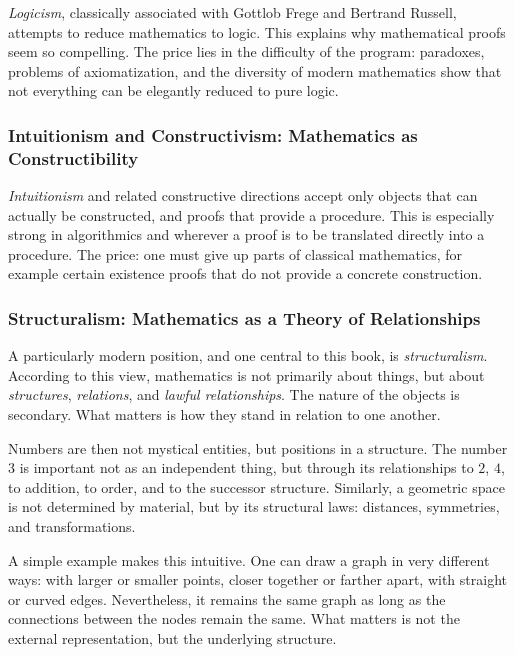 \emph{Logicism},
classically associated with Gottlob Frege
and Bertrand Russell,
attempts
to reduce mathematics to logic.
This explains
why mathematical proofs seem so compelling.
The price lies in the difficulty of the program:
paradoxes,
problems of axiomatization,
and the diversity of modern mathematics show
that not everything can be elegantly reduced to pure logic.

\subsubsection*{Intuitionism and Constructivism: Mathematics as Constructibility}

\emph{Intuitionism}
and related constructive directions accept only objects
that can actually be constructed,
and proofs
that provide a procedure.
This is especially strong in algorithmics
and wherever a proof is to be translated directly into a procedure.
The price:
one must give up parts of classical mathematics,
for example certain existence proofs
that do not provide a concrete construction.

\subsubsection*{Structuralism: Mathematics as a Theory of Relationships}

A particularly modern position,
and one central to this book,
is \emph{structuralism}.
According to this view, mathematics is not primarily about things,
but about \emph{structures},
\emph{relations},
and \emph{lawful relationships}.
The nature of the objects is secondary.
What matters is
how they stand in relation to one another.

Numbers are then not mystical entities,
but positions in a structure.
The number \(3\) is important not as an independent thing,
but through its relationships to \(2\),
\(4\),
to addition,
to order,
and to the successor structure.
Similarly, a geometric space is not determined by material,
but by its structural laws:
distances,
symmetries,
and transformations.

A simple example makes this intuitive.
One can draw a graph in very different ways:
with larger or smaller points,
closer together or farther apart,
with straight or curved edges.
Nevertheless, it remains the same graph
as long as the connections between the nodes remain the same.
What matters is not the external representation,
but the underlying structure.

